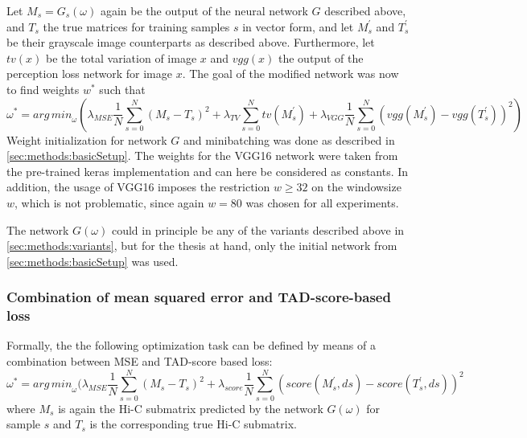 Let $M_s=G_s(\omega)$ again be the output of the neural network $G$ described above, and $T_s$ the true matrices for training samples $s$ in vector form,
and let $M^\prime_s$ and $T^\prime_s$ be their grayscale image counterparts as described above.
Furthermore, let $\mathit{tv}(x)$ be the total variation of image $x$ and $\mathit{vgg}(x)$ the output of the perception loss network for image $x$.
The goal of the modified network was now to find weights $w^*$ such that
\begin{equation}
 \omega^* = \mathit{arg\,min}_\omega (  \lambda_\mathit{MSE} \frac{1}{N} \sum_{s=0}^N (M_s - T_s)^2 
                                                     + \lambda_\mathit{TV} \sum_{s=0}^N \mathit{tv}( M^\prime_s) 
                                                     + \lambda_\mathit{VGG} \frac{1}{N} \sum_{s=0}^N (\mathit{vgg}(M^\prime_s) - \mathit{vgg}(T^\prime_s))^2 ) \label{eq:methods:combined_loss}
\end{equation}
Weight initialization for network $G$ and minibatching was done as described in \cref{sec:methods:basicSetup}.
The weights for the VGG16 network were taken from the pre-trained keras implementation and can here be considered as constants.
In addition, the usage of VGG16 imposes the restriction $w \geq 32$ on the windowsize $w$, which is not problematic, since again $w=80$ was chosen for all experiments.

The network $G(\omega)$ could in principle be any of the variants described above in \cref{sec:methods:variants},
but for the thesis at hand, only the initial network from \cref{sec:methods:basicSetup} was used.

\subsubsection{Combination of mean squared error and TAD-score-based loss} \label{sec:methods:score_loss}
Formally, the the following optimization task can be defined by means of a combination between MSE and TAD-score based loss:
\begin{equation}
 \omega^* = \mathit{arg\,min}_\omega (  \lambda_\mathit{MSE} \frac{1}{N} \sum_{s=0}^N (M_s - T_s)^2
                                                    + \lambda_\mathit{score} \frac{1}{N} \sum_{s=0}^N (\mathit{score}(M^\prime_s,ds) - \mathit{score}(T^\prime_s,ds))^2 \label{eq:methods:score_loss}
\end{equation}
where $M_s$ is again the Hi-C submatrix predicted by the network $G(\omega)$ for sample $s$ and $T_s$ is the corresponding true Hi-C submatrix.

